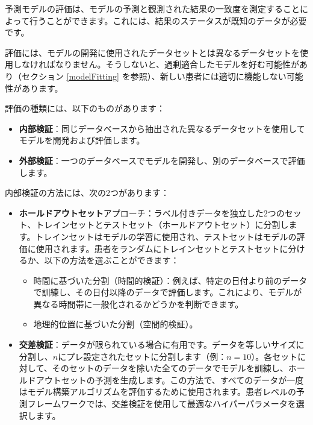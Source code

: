 \documentclass[
  11pt]{book}
\makeatletter
\providecommand{\tightlist}{%
  \setlength{\itemsep}{0pt}\setlength{\parskip}{0pt}}
\newenvironment{kframe}{%
\medskip{}
\setlength{\fboxsep}{.8em}
 \def\at@end@of@kframe{}%
 \ifinner\ifhmode%
  \def\at@end@of@kframe{\end{minipage}}%
  \begin{minipage}{\columnwidth}%
 \fi\fi%
 \def\FrameCommand##1{\hskip\@totalleftmargin \hskip-\fboxsep
 \colorbox{myShadeColor}{##1}\hskip-\fboxsep
     \hskip-\linewidth \hskip-\@totalleftmargin \hskip\columnwidth}%
 \MakeFramed {\advance\hsize-\width
   \@totalleftmargin\z@ \linewidth\hsize
   \@setminipage}}%
 {\par\unskip\endMakeFramed%
 \at@end@of@kframe}
\newenvironment{rmdblock}[1]
  {
  \begin{itemize}
  \renewcommand{\labelitemi}{
    \raisebox{-.7\height}[0pt][0pt]{
      {\setkeys{Gin}{width=3em,keepaspectratio}\texttt{[image: images/\#1]}}
    }
  }
  \setlength{\fboxsep}{1em}
  \begin{kframe}
  \item
  }
  {
  \end{kframe}
  \end{itemize}
  }
\newenvironment{rmdimportant}
  {\begin{rmdblock}{important}}
  {\end{rmdblock}}
\theoremstyle{definition}
\theoremstyle{definition}
\theoremstyle{definition}
\theoremstyle{definition}
\theoremstyle{remark}
\makeatother
\begin{document}
予測モデルの評価は、モデルの予測と観測された結果の一致度を測定することによって行うことができます。これには、結果のステータスが既知のデータが必要です。 

\begin{rmdimportant}
評価には、モデルの開発に使用されたデータセットとは異なるデータセットを使用しなければなりません。そうしないと、過剰適合したモデルを好む可能性があり（セクション \ref{modelFitting} を参照）、新しい患者には適切に機能しない可能性があります。
\end{rmdimportant}

評価の種類には、以下のものがあります：

\begin{itemize}
\tightlist
\item
  \textbf{内部検証}：同じデータベースから抽出された異なるデータセットを使用してモデルを開発および評価します。
\item
  \textbf{外部検証}：一つのデータベースでモデルを開発し、別のデータベースで評価します。  
\end{itemize}

内部検証の方法には、次の2つがあります：

\begin{itemize}
\tightlist
\item
  \textbf{ホールドアウトセット}アプローチ：ラベル付きデータを独立した2つのセット、トレインセットとテストセット（ホールドアウトセット）に分割します。トレインセットはモデルの学習に使用され、テストセットはモデルの評価に使用されます。患者をランダムにトレインセットとテストセットに分けるか、以下の方法を選ぶことができます：

  \begin{itemize}
  \tightlist
  \item
    時間に基づいた分割（時間的検証）：例えば、特定の日付より前のデータで訓練し、その日付以降のデータで評価します。これにより、モデルが異なる時間帯に一般化されるかどうかを判断できます。
  \item
    地理的位置に基づいた分割（空間的検証）。 
  \end{itemize}
\item
  \textbf{交差検証}：データが限られている場合に有用です。データを等しいサイズに分割し、\(n\)にプレ設定されたセットに分割します（例：\(n=10\)）。各セットに対して、そのセットのデータを除いた全てのデータでモデルを訓練し、ホールドアウトセットの予測を生成します。この方法で、すべてのデータが一度はモデル構築アルゴリズムを評価するために使用されます。患者レベルの予測フレームワークでは、交差検証を使用して最適なハイパーパラメータを選択します。 
\end{itemize}
\end{document}
